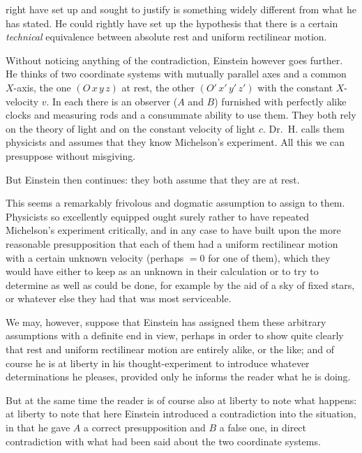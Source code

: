 \documentclass[12pt,a4paper]{article}
\begin{document}
right have set up and sought to justify is something widely different from
what he has stated. He could rightly have set up the hypothesis that there is
a certain \emph{technical} equivalence between absolute rest and uniform
rectilinear motion.

Without noticing anything of the contradiction, Einstein however goes further.
He thinks of two coordinate systems with mutually parallel axes and a common
$X$-axis, the one $(O\,x\,y\,z)$ at rest, the other $(O'\,x'\,y'\,z')$ with
the constant $X$-velocity $v$. In each there is an observer ($A$ and $B$)
furnished with perfectly alike clocks and measuring rods and a consummate
ability to use them. They both rely on the theory of light and on the constant
velocity of light $c$. Dr.\ H. calls them physicists and assumes that they
know Michelson's experiment. All this we can presuppose without misgiving.

But Einstein then continues: they both assume that they are at rest.

This seems a remarkably frivolous and dogmatic assumption to assign to them.
Physicists so excellently equipped ought surely rather to have repeated
Michelson's experiment critically, and in any case to have built upon the more
reasonable presupposition that each of them had a uniform rectilinear motion
with a certain unknown velocity (perhaps $= 0$ for one of them), which they
would have either to keep as an unknown in their calculation or to try to
determine as well as could be done, for example by the aid of a sky of fixed
stars, or whatever else they had that was most serviceable.

We may, however, suppose that Einstein has assigned them these arbitrary
assumptions with a definite end in view, perhaps in order to show quite
clearly that rest and uniform rectilinear motion are entirely alike, or the
like; and of course he is at liberty in his thought-experiment to introduce
whatever determinations he pleases, provided only he informs the reader what
he is doing.

But at the same time the reader is of course also at liberty to note what
happens: at liberty to note that here Einstein introduced a contradiction into
the situation, in that he gave $A$ a correct presupposition and $B$ a false
one, in direct contradiction with what had been said about the two coordinate
systems.
\end{document}
